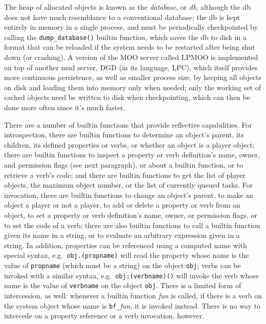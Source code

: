\documentclass{article}
\begin{document}
The heap of allocated objects is known as the \emph{database}, or
\emph{db}, although the db does not have much resemblance to a
conventional database; the db is kept entirely in memory in a single
process, and must be periodically checkpointed by calling the
\texttt{dump\_database()} builtin function, which saves
the db to disk in a format that can be reloaded if the system needs to
be restarted after being shut down (or crashing).  A version of the
MOO server called LPMOO\cite{LPMOO} is implemented on top of another mud server,
DGD\cite{DGD} (in its language, LPC), which itself provides more continuous
persistence, as well as smaller process size, by keeping all objects
on disk and loading them into memory only when needed; only the
working set of cached objects need be written to disk when
checkpointing, which can then be done more often since it's much
faster.

There are a number of builtin functions that provide reflective
capabilities.  For introspection, there are builtin functions to
determine an object's parent, its children, its defined properties or
verbs, or whether an object is a player object; there are builtin
functions to inspect a property or verb definition's name, owner, and
permission flags (see next paragraph), or about a builtin function, or
to retrieve a verb's code; and there are builtin functions to get the
list of player objects, the maximum object number, or the list of
currently queued tasks.  For invocation, there are builtin functions
to change an object's parent, to make an object a player or not a
player, to add or delete a property or verb from an object, to set a
property or verb definition's name, owner, or permission flags, or to
set the code of a verb; there are also builtin functions to call a
builtin function given its name in a string, or to evaluate an
arbitrary expression given in a string.  In addition, properties can
be referenced using a computed name with special syntax,
e.g.~\texttt{obj.(propname)} will read the property whose name is the
value of \texttt{propname} (which must be a string) on the object
\texttt{obj}; verbs can be invoked with a similar syntax,
e.g.~\texttt{obj:(verbname)()} will invoke the verb whose name is the
value of \texttt{verbname} on the object \texttt{obj}.  There is a
limited form of intercession, as well: whenever a builtin function
\textit{fun} is called, if there is a verb on the system object whose
name is \texttt{bf\_}\textit{fun}, it is invoked instead.  There is no
way to intercede on a property reference or a verb invocation,
however.
\end{document}
